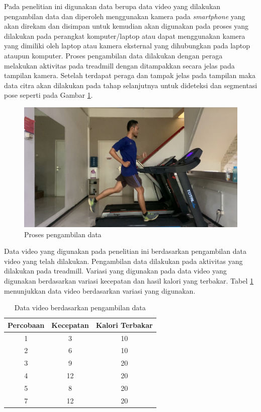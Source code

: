 Pada penelitian ini digunakan data berupa data video yang dilakukan pengambilan data dan diperoleh menggunakan kamera pada \emph{smartphone} yang akan direkam dan disimpan untuk kemudian akan digunakan pada proses yang dilakukan pada perangkat komputer/laptop atau dapat menggunakan kamera yang dimiliki oleh laptop atau kamera eksternal yang dihubungkan pada laptop ataupun komputer. Proses pengambilan data dilakukan dengan peraga melakukan aktivitas pada treadmill dengan ditampakkan secara jelas pada tampilan kamera. Setelah terdapat peraga dan tampak jelas pada tampilan maka data citra akan dilakukan pada tahap selanjutnya untuk dideteksi dan segmentasi pose seperti pada Gambar \ref{fig:DataVideo}.

\begin{figure}[H]
  \centering
  \includegraphics[scale=0.8]{gambar/pengambilan data.png}
  \caption{Proses pengambilan data}
  \label{fig:DataVideo}
\end{figure}

Data video yang digunakan pada penelitian ini berdasarkan pengambilan data video yang telah dilakukan. Pengambilan data dilakukan pada aktivitas yang dilakukan pada treadmill. Variasi yang digunakan pada data video yang digunakan berdasarkan variasi kecepatan dan hasil kalori yang terbakar. Tabel \ref{tb:DatasetVideo} menunjukkan data video berdasarkan variasi yang digunakan.

\begin{longtable}{|c|c|c|}
  \caption{Data video berdasarkan pengambilan data}
  \label{tb:DatasetVideo}  \\
  \hline
  \rowcolor[HTML]{C0C0C0}
  \textbf{Percobaan} & \textbf{Kecepatan} & \textbf{Kalori Terbakar} \\
  \hline
  1     & 3     & 10   \\
  \hline
  2     & 6     & 10   \\
  \hline
  3     & 9     & 20   \\
  \hline
  4     & 12    & 20   \\
  \hline
  5     & 8     & 20   \\
  \hline
  7     & 12    & 20   \\
  \hline
\end{longtable}


